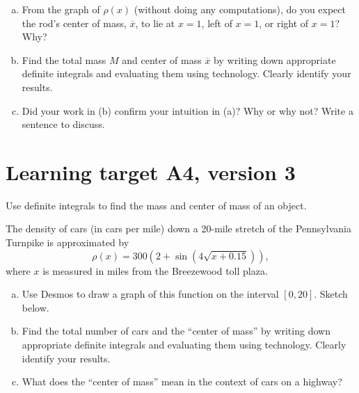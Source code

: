\begin{enumerate}[(a)]
	\item From the graph of $\rho(x)$ (without doing any computations), do you expect the rod's center of mass, $\overline{x}$, to lie at $x = 1$, left of $x = 1$, or right of $x = 1$?  Why?
	
	\vfill
	
	\item Find the total mass $M$ and center of mass $\overline{x}$ by writing down appropriate definite integrals and evaluating them using technology.  Clearly identify your results.

	\vfill
	\vfill

	\item Did your work in (b) confirm your intuition in (a)?  Why or why not?  Write a sentence to discuss.

	\vfill
	
\end{enumerate}

\pagebreak

\section{Learning target A4, version 3}

Use definite integrals to find the mass and center of mass of an object.

\hrulefill

The density of cars (in cars per mile) down a 20-mile stretch of the Pennsylvania Turnpike is approximated by
\[\rho(x) = 300 \left( 2 + \sin\left( 4\sqrt{x+0.15}\right)\right),\]
where $x$ is measured in miles from the Breezewood toll plaza.

\begin{enumerate}[(a)]
	\item Use Desmos to draw a graph of this function on the interval $[0, 20]$. Sketch below.
	\vfill
	\item Find the total number of cars and the ``center of mass'' by writing down appropriate definite integrals and evaluating them using technology.  Clearly identify your results.

	\vfill
	\vfill
	\item What does the ``center of mass'' mean in the context of cars on a highway?
	
\end{enumerate}

